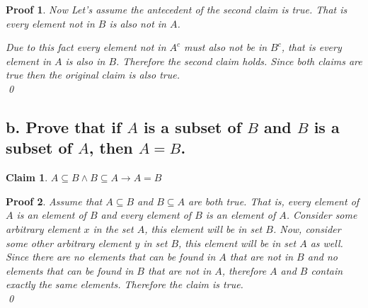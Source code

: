 \documentclass{article}
\newtheorem*{claim}{Claim}
\newtheorem*{poof}{Proof}
\begin{document}
\begin{poof}
    Now Let's assume the antecedent of the second claim is true. That is every element not in $B$ is also not in $A$.
    \begin{figure}[H]
        \centering
        \end{figure}
    Due to this fact every element not in $A^c$ must also not be in $B^c$, that is every element in $A$ is also in $B$. Therefore the second claim holds. Since both claims are true then the original claim is also true. \\ 
    \qed

\end{poof}


\subsection*{b. Prove that if $A$ is a subset of $B$ and $B$ is a subset of $A$, then $A=B$.}
\begin{claim}
    $A \subseteq B \wedge B \subseteq A \rightarrow A = B$
\end{claim}
\begin{poof}
    Assume that $A \subseteq B$ and $B \subseteq A$ are both true. That is, every element of $A$ is an element of $B$ and every element of $B$ is an element of $A$. Consider some arbitrary element $x$ in the set $A$, this element will be in set $B$. Now, consider some other arbitrary element $y$ in set $B$, this element will be in set $A$ as well. Since there are no elements that can be found in $A$ that are not in $B$ and no elements that can be found in $B$ that are not in $A$, therefore $A$ and $B$ contain exactly the same elements. Therefore the claim is true. \\ 
    \qed
\end{poof}
\end{document}
